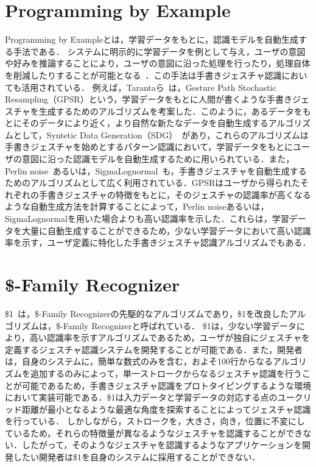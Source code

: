 \section{Programming by Example}
Programming by Exampleとは，学習データをもとに，認識モデルを自動生成する手法である．
システムに明示的に学習データを例として与え，ユーザの意図や好みを推論することにより，ユーザの意図に沿った処理を行ったり，処理自体を削減したりすることが可能となる~\cite{110003743975}．この手法は手書きジェスチャ認識においても活用されている．
例えば，Tarantaら~\cite{Taranta:2016:RPA:2984511.2984525}は，Gesture Path Stochastic Resampling（GPSR）という，学習データをもとに人間が書くような手書きジェスチャを生成するためのアルゴリズムを考案した．このように，あるデータをもとにそのデータにより近く，より自然な新たなデータを自動生成するアルゴリズムとして，Syntetic Data Generation（SDG）~\cite{conf/iccv/NavaratnamFC07,Shotton:2011:RHP:2191740.2192047,Galbally_syntheticgeneration,Lundin:2002:SFD:646280.687684,Gatos:2005:SAK:1106779.1106876,Rodriguez-Serrano:2012:SQH:2240326.2240755,Fischer:2013:GLS:2501115.2501123}があり，これらのアルゴリズムは手書きジェスチャを始めとするパターン認識において，学習データをもとにユーザの意図に沿った認識モデルを自動生成するために用いられている．また，Perlin noise~\cite{Perlin:1985:IS:325165.325247}あるいは，SigmaLognormal~\cite{SigmaLognormal}も，手書きジェスチャを自動生成するためのアルゴリズムとして広く利用されている．GPSRはユーザから得られたそれぞれの手書きジェスチャの特徴をもとに，そのジェスチャの認識率が高くなるような自動生成方法を計算することによって，Perlin noiseあるいは，SigmaLognormalを用いた場合よりも高い認識率を示した．これらは，学習データを大量に自動生成することができるため，少ない学習データにおいて高い認識率を示す，ユーザ定義に特化した手書きジェスチャ認識アルゴリズムでもある．

\section{\$-Family Recognizer}
\$1~\cite{Wobbrock:2007:GWL:1294211.1294238}は，\$-Family Recognizerの先駆的なアルゴリズムであり，\$1を改良したアルゴリズムは，\$-Family Recognizerと呼ばれている．
\$1は，少ない学習データにより，高い認識率を示すアルゴリズムであるため，ユーザが独自にジェスチャを定義するジェスチャ認識システムを開発することが可能である．また，開発者は，自身のシステムに，簡単な数式のみを含む，およそ100行からなるアルゴリズムを追加するのみによって，単一ストロークからなるジェスチャ認識を行うことが可能であるため，手書きジェスチャ認識をプロトタイピングするような環境において実装可能である．\$1は入力データと学習データの対応する点のユークリッド距離が最小となるような最適な角度を探索することによってジェスチャ認識を行っている．
しかしながら，ストロークを，大きさ，向き，位置に不変にしているため，それらの特徴量が異なるようなジェスチャを認識することができない．したがって，そのようなジェスチャを認識するようなアプリケーションを開発したい開発者は\$1を自身のシステムに採用することができない．

